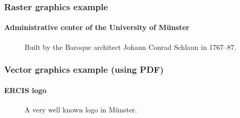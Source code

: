 \begin{frame}[c]
    \frametitle{Raster graphics example}
    \framesubtitle{Administrative center of the University of Münster}

    \begin{figure}
        \begin{center}
            \caption{Built by the Baroque architect Johann Conrad Schlaun in 1767–87.}
        \end{center}
    \end{figure}
\end{frame}

\begin{frame}[c]
    \frametitle{Vector graphics example (using PDF)}
    \framesubtitle{ERCIS logo}

    \begin{figure}
        \begin{center}
            \caption{A very well known logo in Münster.}
        \end{center}
    \end{figure}
\end{frame}

